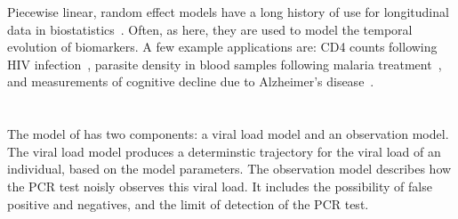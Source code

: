 \documentclass[thesis.tex]{subfiles}
\begin{document}
Piecewise linear, random effect models have a long history of use for longitudinal data in biostatistics~\autocites{slateStatistical}.
Often, as here, they are used to model the temporal evolution of biomarkers.
A few example applications are: CD4 counts following HIV infection~\autocites{langeHierarchical,lynchPredicting}, parasite density in blood samples following malaria treatment~\autocites{fogartyBayesian}, and measurements of cognitive decline due to Alzheimer's disease~\autocites{bealisleBayesian}.

\section{\texorpdfstring{\textcite{hakkiOnset}}{Hakki \etal (2022)}} \label{ATACCC:sec:hakki}

The model of \textcite{hakkiOnset} has two components: a viral load model and an observation model.
The viral load model produces a determinstic trajectory for the viral load of an individual, based on the model parameters.
The observation model describes how the PCR test noisly observes this viral load.
It includes the possibility of false positive and negatives, and the limit of detection of the PCR test.
\end{document}
